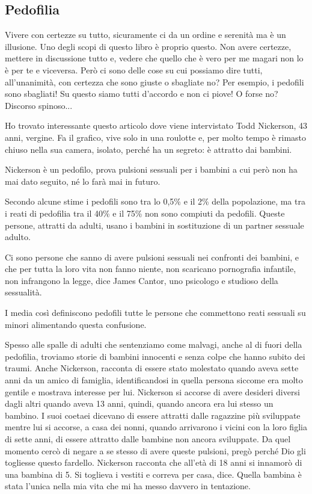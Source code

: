 \subsection{Pedofilia}
Vivere con certezze su tutto, sicuramente ci da un ordine e serenità ma è un illusione. Uno degli scopi di questo libro
è proprio questo. Non avere certezze, mettere in discussione tutto e, vedere che quello che è vero per me magari non lo
è per te e viceversa. Però ci sono delle cose su cui possiamo dire tutti, all'unanimità, con certezza che sono giuste o
sbagliate no? Per esempio, i pedofili sono sbagliati! Su questo siamo tutti d'accordo e non ci piove! O forse no?
Discorso spinoso...

Ho trovato interessante questo
articolo dove viene
intervistato Todd Nickerson, 43 anni, vergine. Fa il grafico, vive solo in una roulotte e, per molto tempo è rimasto
chiuso nella sua camera, isolato, perché ha un segreto: è attratto dai bambini.

Nickerson è un pedofilo, prova pulsioni sessuali per i bambini a cui però non ha mai dato seguito, né lo farà mai in
futuro.

Secondo alcune stime i pedofili sono tra lo 0,5\% e il 2\% della popolazione, ma tra i reati di pedofilia tra il 40\% e
il 75\% non sono compiuti da pedofili. Queste persone, attratti da adulti, usano i bambini in sostituzione di un
partner sessuale adulto.

{\textquotedbl}Ci sono persone che sanno di avere pulsioni sessuali nei confronti dei bambini, e che per tutta la loro
vita non fanno niente, non scaricano pornografia infantile, non infrangono la legge,{\textquotedbl} dice James Cantor,
uno psicologo e studioso della sessualità.

I media così definiscono pedofili tutte le persone che commettono reati sessuali su minori alimentando questa
confusione.

Spesso alle spalle di adulti che sentenziamo come malvagi, anche al di fuori della pedofilia, troviamo storie di bambini
innocenti e senza colpe che hanno subito dei traumi. Anche Nickerson, racconta di essere stato molestato quando aveva
sette anni da un amico di famiglia, identificandosi in quella persona siccome era molto gentile e mostrava interesse
per lui. Nickerson si accorse di avere desideri diversi dagli altri quando aveva 13 anni, quindi, quando ancora era lui
stesso un bambino. I suoi coetaei dicevano di essere attratti dalle ragazzine più sviluppate mentre lui si accorse, a
casa dei nonni, quando arrivarono i vicini con la loro figlia di sette anni, di essere attratto dalle bambine non
ancora sviluppate. Da quel momento cercò di negare a se stesso di avere queste pulsioni, pregò perché Dio gli togliesse
questo fardello. Nickerson racconta che all'età di 18 anni si innamorò di una bambina di 5. {\textquotedbl}Si toglieva
i vestiti e correva per casa,{\textquotedbl} dice. {\textquotedbl}Quella bambina è stata l'unica nella mia vita che mi
ha messo davvero in tentazione.{\textquotedbl}


